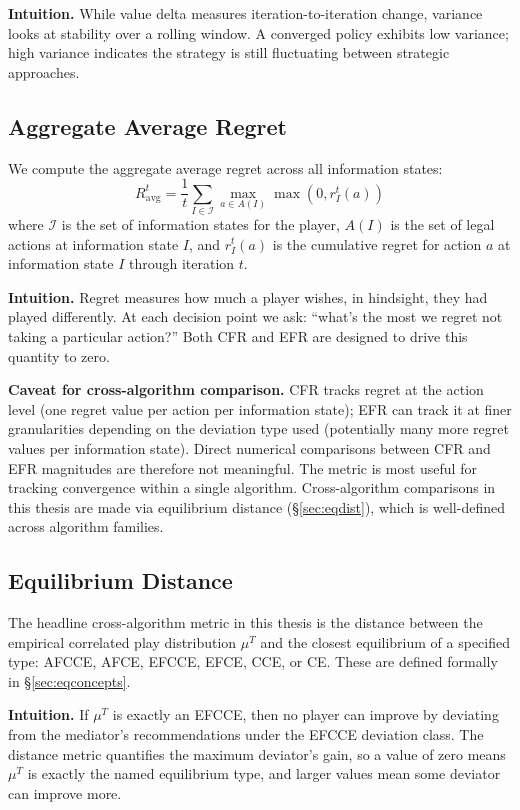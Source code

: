 \documentclass[11pt]{article}
\begin{document}
\textbf{Intuition.} While value delta measures iteration-to-iteration change, variance looks at stability over a rolling window. A converged policy exhibits low variance; high variance indicates the strategy is still fluctuating between strategic approaches.

\subsection{Aggregate Average Regret}

We compute the aggregate average regret across all information states:
\begin{equation}
R^t_{\text{avg}} = \frac{1}{t} \sum_{I \in \mathcal{I}} \max_{a \in A(I)} \max\left(0, r^t_I(a)\right)
\end{equation}
where $\mathcal{I}$ is the set of information states for the player, $A(I)$ is the set of legal actions at information state $I$, and $r^t_I(a)$ is the cumulative regret for action $a$ at information state $I$ through iteration $t$.

\textbf{Intuition.} Regret measures how much a player wishes, in hindsight, they had played differently. At each decision point we ask: ``what's the most we regret not taking a particular action?'' Both CFR and EFR are designed to drive this quantity to zero.

\textbf{Caveat for cross-algorithm comparison.} CFR tracks regret at the action level (one regret value per action per information state); EFR can track it at finer granularities depending on the deviation type used (potentially many more regret values per information state). Direct numerical comparisons between CFR and EFR magnitudes are therefore not meaningful. The metric is most useful for tracking convergence within a single algorithm. Cross-algorithm comparisons in this thesis are made via equilibrium distance (\S\ref{sec:eqdist}), which is well-defined across algorithm families.

\subsection{Equilibrium Distance}

The headline cross-algorithm metric in this thesis is the distance between the empirical correlated play distribution $\mu^T$ and the closest equilibrium of a specified type: AFCCE, AFCE, EFCCE, EFCE, CCE, or CE. These are defined formally in \S\ref{sec:eqconcepts}.

\textbf{Intuition.} If $\mu^T$ is exactly an EFCCE, then no player can improve by deviating from the mediator's recommendations under the EFCCE deviation class. The distance metric quantifies the maximum deviator's gain, so a value of zero means $\mu^T$ is exactly the named equilibrium type, and larger values mean some deviator can improve more.
\end{document}
